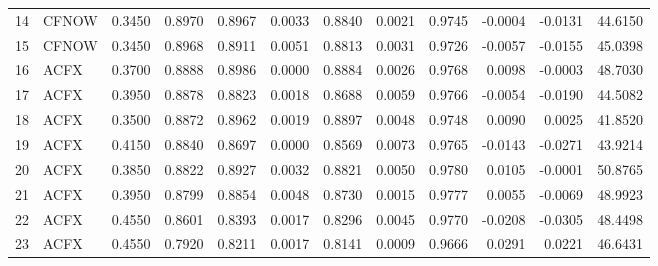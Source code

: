 \begin{tabular}{rlrrrrrrrrrr}
 14 &  CFNOW &  0.3450 &     0.8970 &  0.8967 &     0.0033 &   0.8840 &      0.0021 &      0.9745 &  -0.0004 &   -0.0131 &  44.6150 \\
 15 &  CFNOW &  0.3450 &     0.8968 &  0.8911 &     0.0051 &   0.8813 &      0.0031 &      0.9726 &  -0.0057 &   -0.0155 &  45.0398 \\
 16 &   ACFX &  0.3700 &     0.8888 &  0.8986 &     0.0000 &   0.8884 &      0.0026 &      0.9768 &   0.0098 &   -0.0003 &  48.7030 \\
 17 &   ACFX &  0.3950 &     0.8878 &  0.8823 &     0.0018 &   0.8688 &      0.0059 &      0.9766 &  -0.0054 &   -0.0190 &  44.5082 \\
 18 &   ACFX &  0.3500 &     0.8872 &  0.8962 &     0.0019 &   0.8897 &      0.0048 &      0.9748 &   0.0090 &    0.0025 &  41.8520 \\
 19 &   ACFX &  0.4150 &     0.8840 &  0.8697 &     0.0000 &   0.8569 &      0.0073 &      0.9765 &  -0.0143 &   -0.0271 &  43.9214 \\
 20 &   ACFX &  0.3850 &     0.8822 &  0.8927 &     0.0032 &   0.8821 &      0.0050 &      0.9780 &   0.0105 &   -0.0001 &  50.8765 \\
 21 &   ACFX &  0.3950 &     0.8799 &  0.8854 &     0.0048 &   0.8730 &      0.0015 &      0.9777 &   0.0055 &   -0.0069 &  48.9923 \\
 22 &   ACFX &  0.4550 &     0.8601 &  0.8393 &     0.0017 &   0.8296 &      0.0045 &      0.9770 &  -0.0208 &   -0.0305 &  48.4498 \\
 23 &   ACFX &  0.4550 &     0.7920 &  0.8211 &     0.0017 &   0.8141 &      0.0009 &      0.9666 &   0.0291 &    0.0221 &  46.6431 \\
\bottomrule
\end{tabular}
